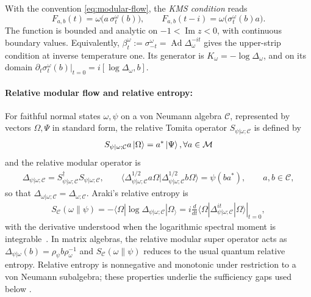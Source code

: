\documentclass[a4paper,11pt]{article}
\theoremstyle{definition}
\newcommand{\mM}{\mathcal{M}}
\begin{document}
With the convention \eqref{eq:modular-flow}, the \emph{KMS condition} reads
\begin{equation}
 F_{a,b}(t)=\omega\bigl(a\,\sigma_t^\omega(b)\bigr),
 \qquad F_{a,b}(t-i)=\omega\bigl(\sigma_t^\omega(b)a\bigr).
 \label{eq:KMS-function}
\end{equation}
The function is bounded and analytic on $-1<\operatorname{Im}z<0$, with continuous
boundary values. Equivalently, $\beta_t^\omega:=\sigma_{-t}^\omega
=\operatorname{Ad}\Delta_\omega^{-it}$ gives the upper-strip condition at inverse
temperature one. Its generator is $K_\omega=-\log\Delta_\omega$, and on its domain
$\partial_t\sigma_t^\omega(b)|_{t=0}=i[\log\Delta_\omega,b]$.


\paragraph{Relative modular flow and relative entropy:}
For faithful normal states $\omega,\psi$ on a von Neumann algebra $\mathcal C$, represented by vectors $\Omega,\Psi$ in standard form, the relative Tomita operator $S_{\psi|\omega;\mathcal C}$ is defined by
\begin{align}
 S_{\psi|\omega;\mathcal C} a\ket{\Omega}=a^*\ket{\Psi},  \forall a\in\mM
\end{align}
and the relative modular operator is
\begin{align}
 \Delta_{\psi|\omega;\mathcal C}=S_{\psi|\omega;\mathcal C}^\dagger S_{\psi|\omega;\mathcal C},
 \qquad
 \langle\Delta_{\psi|\omega;\mathcal C}^{1/2}a\Omega|\Delta_{\psi|\omega;\mathcal C}^{1/2}b\Omega\rangle=\psi(ba^*),\qquad a,b\in\mathcal C,
 \label{eq:relative-modular}
\end{align}
so that $\Delta_{\omega|\omega;\mathcal C}=\Delta_{\omega;\mathcal C}$. Araki's relative entropy is
\begin{align}
 S_{\mathcal C}(\omega\|\psi)
 =-\langle\Omega|\log\Delta_{\psi|\omega;\mathcal C}|\Omega_\rangle
 =i\left.\frac{d}{dt}\langle\Omega|\Delta_{\psi|\omega;\mathcal C}^{it}|\Omega\rangle\right|_{t=0},
 \label{eq:relative-entropy}
\end{align}
with the derivative understood when the logarithmic spectral moment is integrable~\cite{Araki1976,Araki1977}. In matrix algebras, the relative modular super operator acts as  $\Delta_{\psi|\omega}(b)=\rho_\psi b \rho_\omega^{-1}$ and $S_{\mathcal C}(\omega\|\psi)$ reduces to the usual quantum relative entropy. Relative entropy is nonnegative and monotonic under restriction to a von Neumann subalgebra; these properties underlie the sufficiency gaps used below \cite{Araki1976}.
\end{document}
